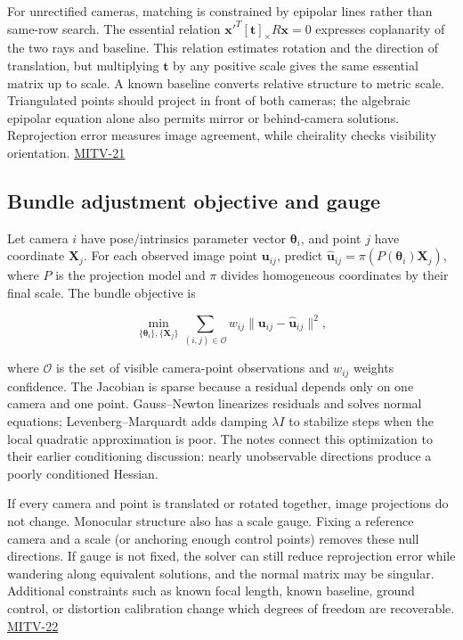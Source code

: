For unrectified cameras, matching is constrained by epipolar lines rather than same-row search. The essential relation \(\mathbf{x}'^T[\mathbf t]_\times R\mathbf{x}=0\) expresses coplanarity of the two rays and baseline. This relation estimates rotation and the direction of translation, but multiplying \(\mathbf t\) by any positive scale gives the same essential matrix up to scale. A known baseline converts relative structure to metric scale. Triangulated points should project in front of both cameras; the algebraic epipolar equation alone also permits mirror or behind-camera solutions. Reprojection error measures image agreement, while cheirality checks visibility orientation. \hyperref[04-visual-computing-ii-ch036-mitv-21---relative-orientation-binocular-stereo-structure-quadrics-calibration-reprojection]{MITV-21}

\subsection{Bundle adjustment objective and gauge}\label{04-visual-computing-ii-ch032-bundle-adjustment-objective-and-gauge}

Let camera \(i\) have pose/intrinsics parameter vector \(\boldsymbol\theta_i\), and point \(j\) have coordinate \(\mathbf X_j\). For each observed image point \(\mathbf u_{ij}\), predict \(\hat{\mathbf u}_{ij}=\pi(P(\boldsymbol\theta_i)\mathbf X_j)\), where \(P\) is the projection model and \(\pi\) divides homogeneous coordinates by their final scale. The bundle objective is

\[
\min_{\{\boldsymbol\theta_i\},\{\mathbf X_j\}}\sum_{(i,j)\in\mathcal O}w_{ij}\|\mathbf u_{ij}-\hat{\mathbf u}_{ij}\|^2,
\]

where \(\mathcal O\) is the set of visible camera-point observations and \(w_{ij}\) weights confidence. The Jacobian is sparse because a residual depends only on one camera and one point. Gauss--Newton linearizes residuals and solves normal equations; Levenberg--Marquardt adds damping \(\lambda I\) to stabilize steps when the local quadratic approximation is poor. The notes connect this optimization to their earlier conditioning discussion: nearly unobservable directions produce a poorly conditioned Hessian.

If every camera and point is translated or rotated together, image projections do not change. Monocular structure also has a scale gauge. Fixing a reference camera and a scale (or anchoring enough control points) removes these null directions. If gauge is not fixed, the solver can still reduce reprojection error while wandering along equivalent solutions, and the normal matrix may be singular. Additional constraints such as known focal length, known baseline, ground control, or distortion calibration change which degrees of freedom are recoverable. \hyperref[04-visual-computing-ii-ch036-mitv-22---exterior-orientation-recovering-position-orientation-bundle-adjustment-object-shape]{MITV-22}

